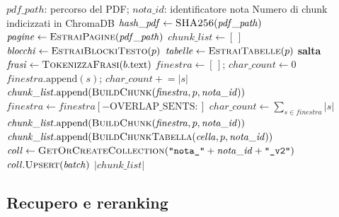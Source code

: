 \begin{algorithm}[htbp]
\caption{Indicizzazione di una nota AIFA (\texttt{indicizza\_nota})}
\label{alg:ingest}
\begin{algorithmic}[1]
\Require $\mathit{pdf\_path}$: percorso del PDF; $\mathit{nota\_id}$: identificatore nota
\Ensure Numero di chunk indicizzati in ChromaDB
\State $\mathit{hash\_pdf} \gets \textsc{SHA256}(\mathit{pdf\_path})$
\State $\mathit{pagine} \gets \textsc{EstraiPagine}(\mathit{pdf\_path})$
\State $\mathit{chunk\_list} \gets [\,]$
  \State $\mathit{blocchi} \gets \textsc{EstraiBlockiTesto}(p)$
  \State $\mathit{tabelle} \gets \textsc{EstraiTabelle}(p)$ 
     \State \textbf{salta}
    \EndIf
    \State $\mathit{frasi} \gets \textsc{TokenizzaFrasi}(b.\text{text})$ 
    \State $\mathit{finestra} \gets [\,]$; $\mathit{char\_count} \gets 0$
      \State $\mathit{finestra}.\text{append}(s)$; $\mathit{char\_count} \mathrel{+}= |s|$
        \State $\mathit{chunk\_list}.\text{append}(\textsc{BuildChunk}(\mathit{finestra}, p, \mathit{nota\_id}))$
        \State $\mathit{finestra} \gets \mathit{finestra}[-\mathrm{OVERLAP\_SENTS}:]$
        \State $\mathit{char\_count} \gets \sum_{s \in \mathit{finestra}} |s|$
      \EndIf
    \EndFor
      \State $\mathit{chunk\_list}.\text{append}(\textsc{BuildChunk}(\mathit{finestra}, p, \mathit{nota\_id}))$
    \EndIf
  \EndFor
  \State {}
    \State $\mathit{chunk\_list}.\text{append}(\textsc{BuildChunkTabella}(\mathit{cella}, p, \mathit{nota\_id}))$
  \EndFor
\EndFor
\State {}
\State $\mathit{coll} \gets \textsc{GetOrCreateCollection}(\texttt{"nota\_"} + \mathit{nota\_id} + \texttt{"\_v2"})$
  \State $\mathit{coll}.\textsc{Upsert}(\mathit{batch})$
\EndFor
\State \Return $|\mathit{chunk\_list}|$
\end{algorithmic}
\end{algorithm}

\subsection{Recupero e reranking}

